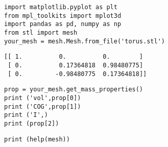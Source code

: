\documentclass[12pt,fleqn]{article}\usepackage{../../common}
\begin{document}
\begin{verbatim}
import matplotlib.pyplot as plt
from mpl_toolkits import mplot3d
import pandas as pd, numpy as np
from stl import mesh
your_mesh = mesh.Mesh.from_file('torus.stl')
\end{verbatim}

\begin{verbatim}
[[ 1.          0.          0.        ]
 [ 0.          0.17364818  0.98480775]
 [ 0.         -0.98480775  0.17364818]]
\end{verbatim}


\begin{verbatim}
prop = your_mesh.get_mass_properties()
print ('vol',prop[0])
print ('COG',prop[1])
print ('I',)
print (prop[2])
\end{verbatim}












\begin{verbatim}
print (help(mesh))
\end{verbatim}
\end{document}
